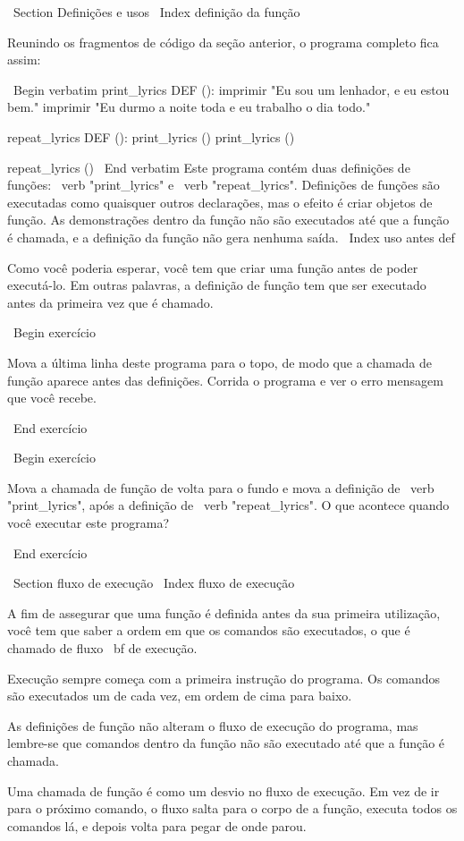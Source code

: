 \documentclass[10pt]{book}
\begin{document}
\begin {itemize}
{\ Section {Definições e usos}
\ Index {definição da função}

Reunindo os fragmentos de código da seção anterior, o
programa completo fica assim:

\ Begin {verbatim}
print_lyrics DEF ():
    imprimir "Eu sou um lenhador, e eu estou bem."
    imprimir "Eu durmo a noite toda e eu trabalho o dia todo."

repeat_lyrics DEF ():
    print_lyrics ()
    print_lyrics ()

repeat_lyrics ()
\ End {verbatim}
%
Este programa contém duas definições de funções: \ verb "print_lyrics" e
\ verb "repeat_lyrics". Definições de funções são executadas como quaisquer outros
declarações, mas o efeito é criar objetos de função. As demonstrações
dentro da função não são executados até que a função é chamada, e
a definição da função não gera nenhuma saída.
\ Index {uso antes def}

Como você poderia esperar, você tem que criar uma função antes de poder
executá-lo. Em outras palavras, a definição de função tem que ser
executado antes da primeira vez que é chamado.

\ Begin {} exercício

Mova a última linha deste programa
para o topo, de modo que a chamada de função aparece antes das definições. Corrida
o programa e ver o erro
mensagem que você recebe.

\ End {} exercício

\ Begin {} exercício

Mova a chamada de função de volta para o fundo
e mova a definição de \ verb "print_lyrics", após a definição de
\ verb "repeat_lyrics". O que acontece quando você executar este programa?

\ End {} exercício


\ Section {fluxo de execução}
\ Index {fluxo de execução}

A fim de assegurar que uma função é definida antes da sua primeira utilização,
você tem que saber a ordem em que os comandos são executados, o que é
chamado de fluxo {\ bf de execução}.

Execução sempre começa com a primeira instrução do programa.
Os comandos são executados um de cada vez, em ordem de cima para baixo.

As definições de função não alteram o fluxo de execução do
programa, mas lembre-se que comandos dentro da função não são
executado até que a função é chamada.

Uma chamada de função é como um desvio no fluxo de execução. Em vez de
ir para o próximo comando, o fluxo salta para o corpo de
a função, executa todos os comandos lá, e depois volta
para pegar de onde parou.

}
\end{itemize}
\end{document}
